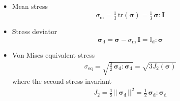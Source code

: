 \documentclass[times,namecite]{goose-article}
\begin{document}
\begin{itemize}
%
\item Mean stress
%
\begin{equation}
\sigma_\mathrm{m}
= \tfrac{1}{3} \, \mathrm{tr} ( \bm{\sigma} )
= \tfrac{1}{3} \, \bm{\sigma} : \bm{I}
\end{equation}
%
\item Stress deviator
%
\begin{equation}
  \bm{\sigma}_\mathrm{d}
  = \bm{\sigma} - \sigma_\mathrm{m} \, \bm{I}
  = \mathbb{I}_\mathrm{d} : \bm{\sigma}
\end{equation}
%
\item Von Mises equivalent stress
\begin{align}
\sigma_\mathrm{eq}
= \sqrt{ \tfrac{3}{2} \, \bm{\sigma}_\mathrm{d} : \bm{\sigma}_\mathrm{d} }
= \sqrt{ 3 J_2(\bm{\sigma}) }
\end{align}
where the second-stress invariant
\begin{align}
J_2 = \tfrac{1}{2} \, || \, \bm{\sigma}_\mathrm{d} \, ||^2
    = \tfrac{1}{2} \, \bm{\sigma}_\mathrm{d} : \bm{\sigma}_\mathrm{d}
\end{align}
%
\end{itemize}


\end{document}
